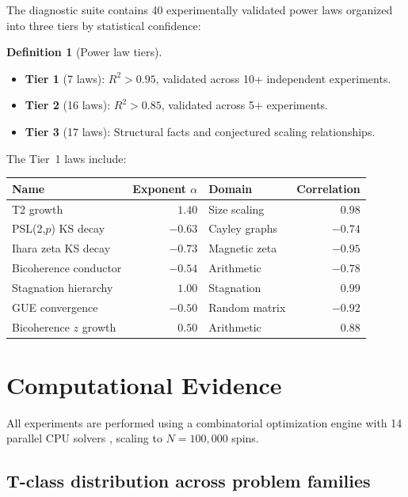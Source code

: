 \documentclass[11pt]{amsart}
\theoremstyle{definition}
\newtheorem{definition}[theorem]{Definition}
\begin{document}
The diagnostic suite contains 40 experimentally validated power laws organized into three tiers by statistical confidence:

\begin{definition}[Power law tiers]
\begin{itemize}
\item \textbf{Tier 1} (7 laws): $R^2 > 0.95$, validated across 10+ independent experiments.
\item \textbf{Tier 2} (16 laws): $R^2 > 0.85$, validated across 5+ experiments.
\item \textbf{Tier 3} (17 laws): Structural facts and conjectured scaling relationships.
\end{itemize}
\end{definition}

The Tier~1 laws include:
\begin{center}
\begin{tabular}{l r l r}
\toprule
Name & Exponent $\alpha$ & Domain & Correlation \\
\midrule
T2 growth & $1.40$ & Size scaling & $0.98$ \\
PSL(2,$p$) KS decay & $-0.63$ & Cayley graphs & $-0.74$ \\
Ihara zeta KS decay & $-0.73$ & Magnetic zeta & $-0.95$ \\
Bicoherence conductor & $-0.54$ & Arithmetic & $-0.78$ \\
Stagnation hierarchy & $1.00$ & Stagnation & $0.99$ \\
GUE convergence & $-0.50$ & Random matrix & $-0.92$ \\
Bicoherence $z$ growth & $0.50$ & Arithmetic & $0.88$ \\
\bottomrule
\end{tabular}
\end{center}


\section{Computational Evidence}
\label{sec:computation}

All experiments are performed using a combinatorial optimization engine with 14 parallel CPU solvers \cite{dsc3engine}, scaling to $N = 100{,}000$ spins.

\subsection{T-class distribution across problem families}
\end{document}
